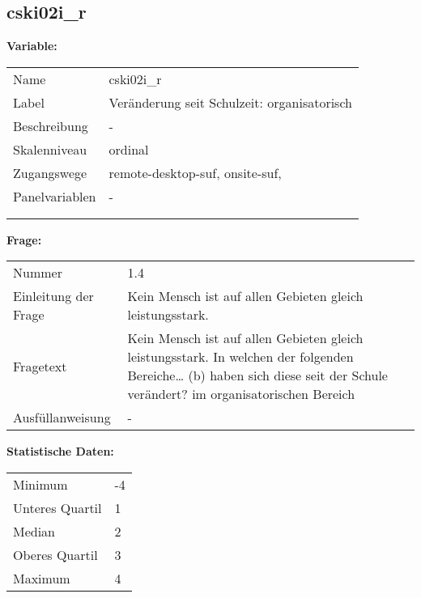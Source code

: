 	
	
	\subsection{cski02i\_r}
	\label{subSection:cski02i_r}

	\noindent\textbf{Variable:}\\
		\begin{tabular}{lL{11.3cm}}
			\label{tableVariable:cski02i_r}
			Name & cski02i\_r \\
			Label & Veränderung seit Schulzeit: organisatorisch \\
			Beschreibung & - \\
			Skalenniveau & ordinal \\
			Zugangswege &
				remote-desktop-suf,
				onsite-suf,
 \\
			Panelvariablen & -
			 \\
			 \\
 \\
		\end{tabular}

		\vspace*{1 cm}
		\noindent\textbf{Frage:}\\
		\begin{tabular}{lL{11.3cm}}
			\label{tableQuestion:cski02i_r}
			Nummer & 1.4 \\
			Einleitung der Frage & Kein Mensch ist auf allen Gebieten gleich leistungsstark. \\
			Fragetext & Kein Mensch ist auf allen Gebieten gleich leistungsstark. In welchen der folgenden Bereiche…
(b) haben sich diese seit der Schule verändert?
im organisatorischen Bereich \\
			Ausfüllanweisung & - \\
		\end{tabular}


		\vspace*{1 cm}
		\noindent\textbf{Statistische Daten:}\\
			\begin{tabular}{ll}
				\label{tableStatistics:cski02i_r}
					Minimum & -4 \\
					Unteres Quartil & 1 \\
					Median & 2 \\
					Oberes Quartil & 3 \\
					Maximum & 4 \\
			\end{tabular}



